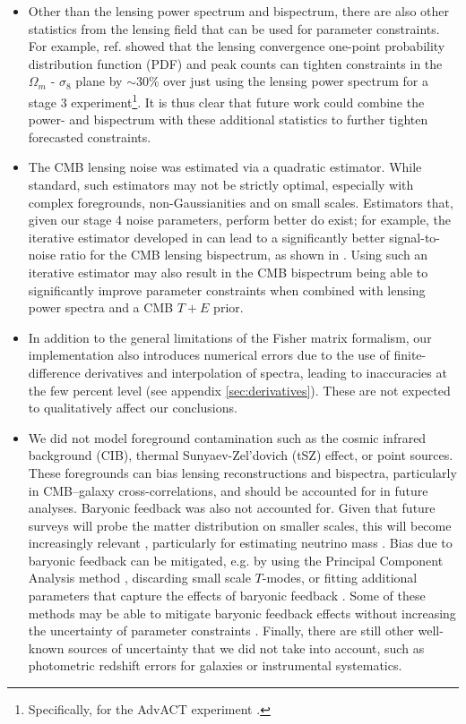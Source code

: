 \documentclass[11pt]{article} %
\begin{document}
\begin{itemize}
     \item Other than the lensing power spectrum and bispectrum, there are also other statistics from the lensing field that can be used for parameter constraints. For example, ref. \cite{Liu_2016} showed that the lensing convergence one-point probability distribution function (PDF) and peak counts can tighten constraints in the $\Omega_m$ - $\sigma_8$ plane by $\sim30\%$ over just using the lensing power spectrum for a stage 3 experiment\footnote{Specifically, for the AdvACT experiment \cite{Liu_2016}.}. It is thus clear that future work could combine the power- and bispectrum with these additional statistics to further tighten forecasted constraints.

    \item The CMB lensing noise was estimated via a quadratic estimator. While standard, such estimators may not be strictly optimal, especially with complex foregrounds, non-Gaussianities and on small scales. Estimators that, given our stage 4 noise parameters, perform better do exist; for example, the iterative estimator developed in \cite{Smith_2012} can lead to a significantly better signal-to-noise ratio for the CMB lensing bispectrum, as shown in \cite{Namikawa_2016}. Using such an iterative estimator may also result in the CMB bispectrum being able to significantly improve parameter constraints when combined with lensing power spectra and a CMB $T+E$ prior.

    \item In addition to the general limitations of the Fisher matrix formalism, our implementation also introduces numerical errors due to the use of finite-difference derivatives and interpolation of spectra, leading to inaccuracies at the few percent level (see appendix \ref{sec:derivatives}). These are not expected to qualitatively affect our conclusions.

    \item We did not model foreground contamination such as the cosmic infrared background (CIB), thermal Sunyaev-Zel'dovich (tSZ) effect, or point sources. These foregrounds can bias lensing reconstructions and bispectra, particularly in CMB–galaxy cross-correlations, and should be accounted for in future analyses. Baryonic feedback was also not accounted for. Given that future surveys will probe the matter distribution on smaller scales, this will become increasingly relevant \cite{McCarthy_2022}, particularly for estimating neutrino mass \cite{PhysRevD.101.063534}. Bias due to baryonic feedback can be mitigated, e.g. by using the Principal Component Analysis method \cite{s2024impactcosmologydependencebaryonic}, discarding small scale $T$-modes, or fitting additional parameters that capture the effects of baryonic feedback \cite{McCarthy_2022}. Some of these methods may be able to mitigate baryonic feedback effects without increasing the uncertainty of parameter constraints \cite{McCarthy_2021}. Finally, there are still other well-known sources of uncertainty that we did not take into account, such as photometric redshift errors for galaxies or instrumental systematics.
    
\end{itemize}
\end{document}
